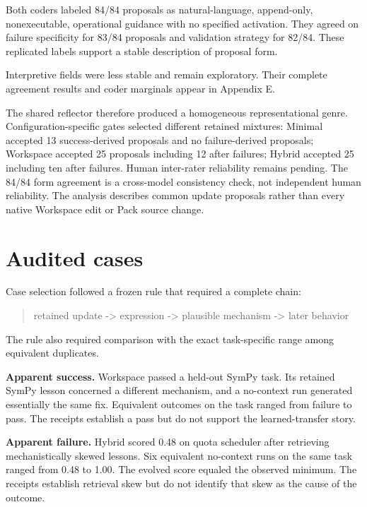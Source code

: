 \documentclass[10pt,twocolumn]{article}
\begin{document}
Both coders labeled 84/84 proposals as natural-language, append-only,
nonexecutable, operational guidance with no specified activation. They
agreed on failure specificity for 83/84 proposals and validation
strategy for 82/84. These replicated labels support a stable description
of proposal form.

Interpretive fields were less stable and remain exploratory. Their
complete agreement results and coder marginals appear in Appendix E.

The shared reflector therefore produced a homogeneous representational
genre. Configuration-specific gates selected different retained
mixtures: Minimal accepted 13 success-derived proposals and no
failure-derived proposals; Workspace accepted 25 proposals including 12
after failures; Hybrid accepted 25 including ten after failures. Human
inter-rater reliability remains pending. The 84/84 form agreement is a
cross-model consistency check, not independent human reliability. The
analysis describes common update proposals rather than every native
Workspace edit or Pack source change.

\section{Audited cases}\label{audited-cases}

Case selection followed a frozen rule that required a complete chain:

\begin{quote}
retained update -\textgreater{} expression -\textgreater{} plausible
mechanism -\textgreater{} later behavior
\end{quote}

The rule also required comparison with the exact task-specific range
among equivalent duplicates.

\textbf{Apparent success.} Workspace passed a held-out SymPy task. Its
retained SymPy lesson concerned a different mechanism, and a no-context
run generated essentially the same fix. Equivalent outcomes on the task
ranged from failure to pass. The receipts establish a pass but do not
support the learned-transfer story.

\textbf{Apparent failure.} Hybrid scored 0.48 on quota scheduler after
retrieving mechanistically skewed lessons. Six equivalent no-context
runs on the same task ranged from 0.48 to 1.00. The evolved score
equaled the observed minimum. The receipts establish retrieval skew but
do not identify that skew as the cause of the outcome.
\end{document}
